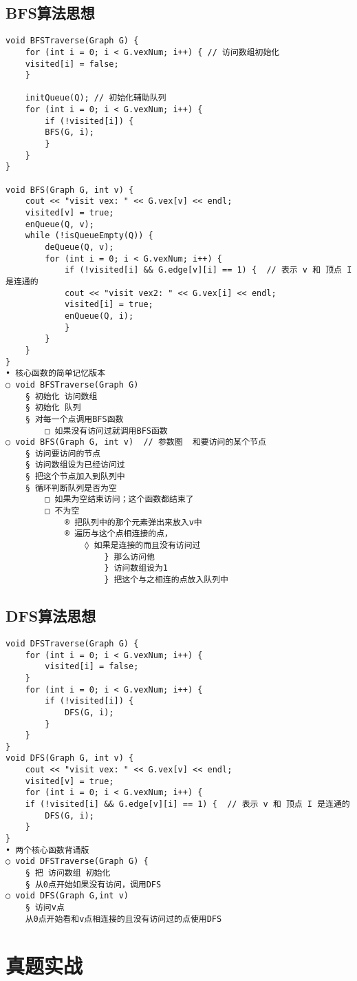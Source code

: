 \subsection{BFS算法思想}
\begin{lstlisting}[basicstyle=\small\ttfamily, caption={}, numbers=none]
void BFSTraverse(Graph G) {
	for (int i = 0; i < G.vexNum; i++) { // 访问数组初始化 
	visited[i] = false;
	}

	initQueue(Q); // 初始化辅助队列
	for (int i = 0; i < G.vexNum; i++) {
		if (!visited[i]) {
		BFS(G, i);
		}
	}
}

void BFS(Graph G, int v) {
	cout << "visit vex: " << G.vex[v] << endl;
	visited[v] = true;
	enQueue(Q, v);
	while (!isQueueEmpty(Q)) {
		deQueue(Q, v);
		for (int i = 0; i < G.vexNum; i++) {
			if (!visited[i] && G.edge[v][i] == 1) {  // 表示 v 和 顶点 I 是连通的
			cout << "visit vex2: " << G.vex[i] << endl;
			visited[i] = true;
			enQueue(Q, i);
			}
		}
	}
}
• 核心函数的简单记忆版本
○ void BFSTraverse(Graph G)
	§ 初始化 访问数组
	§ 初始化 队列
	§ 对每一个点调用BFS函数
		□ 如果没有访问过就调用BFS函数
○ void BFS(Graph G, int v)  // 参数图  和要访问的某个节点
	§ 访问要访问的节点
	§ 访问数组设为已经访问过
	§ 把这个节点加入到队列中
	§ 循环判断队列是否为空
		□ 如果为空结束访问；这个函数都结束了
		□ 不为空
			® 把队列中的那个元素弹出来放入v中
			® 遍历与这个点相连接的点，
				◊ 如果是连接的而且没有访问过
					} 那么访问他
					} 访问数组设为1
					} 把这个与之相连的点放入队列中
\end{lstlisting}


\subsection{DFS算法思想}
\begin{lstlisting}[basicstyle=\small\ttfamily, caption={}, numbers=none]
void DFSTraverse(Graph G) {
	for (int i = 0; i < G.vexNum; i++) {
		visited[i] = false;
	}
	for (int i = 0; i < G.vexNum; i++) {
		if (!visited[i]) {
			DFS(G, i);
		}
	}
}
void DFS(Graph G, int v) {
	cout << "visit vex: " << G.vex[v] << endl;
	visited[v] = true;
	for (int i = 0; i < G.vexNum; i++) {
	if (!visited[i] && G.edge[v][i] == 1) {  // 表示 v 和 顶点 I 是连通的
		DFS(G, i);
	}
}
• 两个核心函数背诵版
○ void DFSTraverse(Graph G) {
	§ 把 访问数组 初始化
	§ 从0点开始如果没有访问，调用DFS
○ void DFS(Graph G,int v)
	§ 访问v点
	从0点开始看和v点相连接的且没有访问过的点使用DFS
\end{lstlisting}

\section{真题实战}
